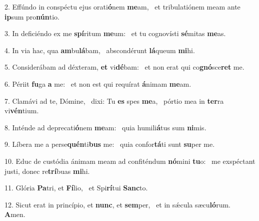 2. Effúndo in conspéctu ejus orati\textbf{ó}nem \textbf{me}am, \ast\  et tribulatiónem meam ante \textbf{ip}sum pro\textbf{nún}tio.\

3. In deficiéndo ex me \textbf{spí}ritum \textbf{me}um: \ast\  et tu cognovísti \textbf{sé}mitas \textbf{me}as.\

4. In via hac, qua \textbf{am}bu\textbf{lá}bam, \ast\  abscondérunt \textbf{lá}queum \textbf{mi}hi.\

5. Considerábam ad déxteram, \textbf{et} vi\textbf{dé}bam: \ast\  et non erat qui co\textbf{gnó}sce\textbf{ret} me.\

6. Périit \textbf{fu}ga \textbf{a} me: \ast\  et non est qui requírat \textbf{á}nimam \textbf{me}am.\

7. Clamávi ad te, Dómine, \dag\  dixi: Tu \textbf{es} spes \textbf{me}a, \ast\  pórtio mea in \textbf{ter}ra vi\textbf{vén}tium.\

8. Inténde ad deprecati\textbf{ó}nem \textbf{me}am: \ast\  quia humili\textbf{á}tus sum \textbf{ni}mis.\

9. Líbera me a perse\textbf{quén}ti\textbf{bus} me: \ast\  quia confor\textbf{tá}ti sunt \textbf{su}per me.\

10. Educ de custódia ánimam meam ad confiténdum \textbf{nó}mini \textbf{tu}o: \ast\  me exspéctant justi, donec re\textbf{trí}buas \textbf{mi}hi.\

11. Glória \textbf{Pa}tri, et \textbf{Fí}lio, \ast\  et Spi\textbf{rí}tui \textbf{Sanc}to.\

12. Sicut erat in princípio, et \textbf{nunc}, et \textbf{sem}per, \ast\  et in sǽcula sæcu\textbf{ló}rum. \textbf{A}men.\

